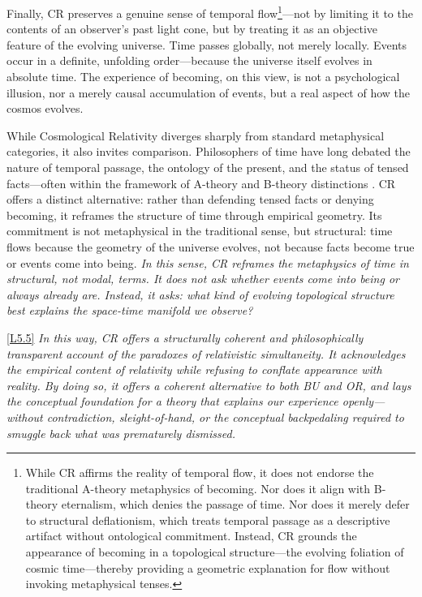 \documentclass[12pt]{book}
\newcounter{logicanchor}
\newenvironment{logicanchorenv}[1]{\refstepcounter{logicanchor}\label{#1}}{}
\newcommand{\logiclink}[2]{\begin{logicanchorenv}{logic:#1}\end{logicanchorenv}\hyperref[appendix:#1]{[#1]}\xspace}
\begin{document}
Finally, CR preserves a genuine sense of temporal flow\footnote{While CR affirms the reality of temporal flow, it does not endorse the traditional A-theory metaphysics of becoming. Nor does it align with B-theory eternalism, which denies the passage of time. Nor does it merely defer to structural deflationism, which treats temporal passage as a descriptive artifact without ontological commitment. Instead, CR grounds the appearance of becoming in a topological structure---the evolving foliation of cosmic time---thereby providing a geometric explanation for flow without invoking metaphysical tenses.}---not by limiting it to the contents of an observer's past light cone, but by treating it as an objective feature of the evolving universe. Time passes globally, not merely locally. Events occur in a definite, unfolding order---because the universe itself evolves in absolute time. The experience of becoming, on this view, is not a psychological illusion, nor a merely causal accumulation of events, but a real aspect of how the cosmos evolves.

While Cosmological Relativity diverges sharply from standard metaphysical categories, it also invites comparison. Philosophers of time have long debated the nature of temporal passage, the ontology of the present, and the status of tensed facts---often within the framework of A-theory and B-theory distinctions \citep{skow2015,callender2017,crisp2003,dorato2006,maudlin2002}. CR offers a distinct alternative: rather than defending tensed facts or denying becoming, it reframes the structure of time through empirical geometry. Its commitment is not metaphysical in the traditional sense, but structural: time flows because the geometry of the universe evolves, not because facts become true or events come into being. \textit{In this sense, CR reframes the metaphysics of time in structural, not modal, terms. It does not ask whether events come into being or always already are. Instead, it asks: what kind of evolving topological structure best explains the space-time manifold we observe?} 

\logiclink{L5.5}{} \textit{In this way, CR offers a structurally coherent and philosophically transparent account of the paradoxes of relativistic simultaneity. It acknowledges the empirical content of relativity while refusing to conflate appearance with reality. By doing so, it offers a coherent alternative to both BU and OR, and lays the conceptual foundation for a theory that explains our experience openly---without contradiction, sleight-of-hand, or the conceptual backpedaling required to smuggle back what was prematurely dismissed.}
\end{document}
